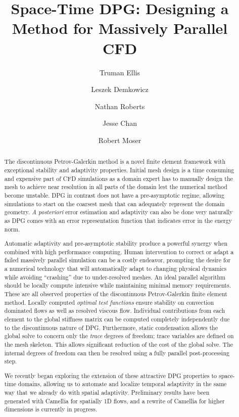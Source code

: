\documentclass[letterpaper]{article}
\title{Space-Time DPG: Designing a Method for Massively Parallel CFD}
\author[1]{Truman Ellis}
\author[1]{Leszek Demkowicz}
\author[2]{Nathan Roberts}
\author[3]{Jesse Chan}
\author[1]{Robert Moser}
\affil[1]{Institute for Computational Engineering and Sciences, University of Texas at Austin}
\affil[2]{Argonne Leadership Computing Facility, Argonne National Laboratory}
\affil[3]{Computational and Applied Math, Rice University}
\date{}
\begin{document}
\maketitle

\begin{abstract}
The discontinuous Petrov-Galerkin method is a novel finite element framework with exceptional stability and adaptivity properties.
Initial mesh design is a time consuming and expensive part of CFD simulations as a domain expert has to manually design the 
mesh to achieve near resolution in all parts of the domain lest the numerical method become unstable.
DPG in contrast does not have a pre-asymptotic regime, allowing simulations to start on the coarsest mesh that can adequately represent the domain geometry.
\emph{A posteriori} error estimation and adaptivity can also be done very naturally as DPG comes with an error representation function 
that indicates error in the energy norm.

Automatic adaptivity and pre-asymptotic stability produce a powerful synergy when combined with high performance computing.
Human intervention to correct or adapt a failed massively parallel simulation can be a costly endeavor, prompting the desire for a
numerical technology that will automatically adapt to changing physical dynamics while avoiding ``crashing'' due to under-resolved meshes.
An ideal parallel algorithm should be locally compute intensive while maintaining minimal memory requirements.
These are all observed properties of the discontinuous Petrov-Galerkin finite element method.
Locally computed \emph{optimal test functions} ensure stability on convection dominated flows as well as resolved viscous flow.
Individual contributions from each element to the global stiffness matrix can be computed completely independently due to the discontinuous nature of DPG.
Furthermore, static condensation allows the global solve to concern only the \emph{trace} degrees of freedom; 
trace variables are defined on the mesh skeleton.  
This allows significant reduction of the cost of the global solve.  
The internal degrees of freedom can then be resolved using a fully parallel post-processing step.

We recently began exploring the extension of these attractive DPG properties to space-time domains, allowing us to automate and localize temporal adaptivity
in the same way that we already do with spatial adaptivity. Preliminary results have been generated with Camellia\cite{Roberts2011} for spatially 1D flows,
and a rewrite of Camellia for higher dimensions is currently in progress.
\end{abstract}



\end{document}
